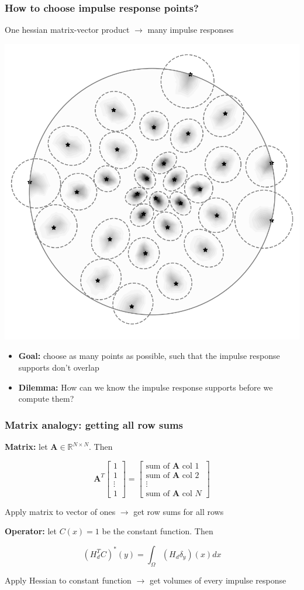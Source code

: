 \documentclass[10pt,final,xcolor=dvipsnames,aspect ratio=169]{beamer}
\begin{document}
\begin{frame}
	\frametitle{How to choose impulse response points?}
	One hessian matrix-vector product $\rightarrow$ many impulse responses
	\begin{center}
		\includegraphics[width=0.5\columnwidth]{impulse_batch2.png} 
	\end{center}
	\begin{itemize}
		\item \textbf{Goal:} choose as many points as possible, such that the impulse response supports don't overlap
		\item \textbf{Dilemma:} How can we know the impulse response supports before we compute them?
	\end{itemize}
\end{frame}
\begin{frame}
	\frametitle{Matrix analogy: getting all row sums}
	
	\textbf{Matrix:} let $\mathbf{A} \in \mathbb{R}^{N \times N}$. Then
	
	$$\mathbf{A}^T \begin{bmatrix}
	1 \\ 1 \\ \vdots \\ 1
	\end{bmatrix} = \begin{bmatrix}
	\text{sum of }\mathbf{A} \text{ col }1 \\
	\text{sum of }\mathbf{A} \text{ col }2 \\
	\vdots \\
	\text{sum of }\mathbf{A} \text{ col }N
	\end{bmatrix}$$
	
	Apply matrix to vector of ones $\rightarrow$ get row sums for all rows
	
	\vspace{3em}
	
	\textbf{Operator:} let $C(x)=1$ be the constant function. Then 
	
	$$(H_d^T C)^*(y) = \int_\Omega \left(H_d \delta_y\right)(x) dx$$
	
	
	Apply Hessian to constant function $\rightarrow$ get volumes of every impulse response
\end{frame}
\end{document}
